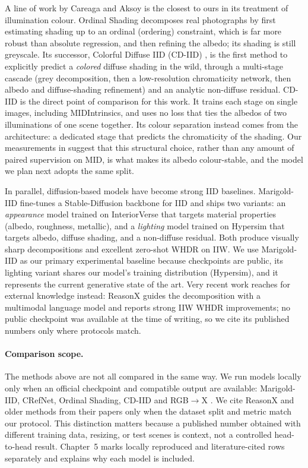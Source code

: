 A line of work by Careaga and Aksoy is the closest to ours in its treatment of
illumination colour.
Ordinal Shading  decomposes real photographs by first
estimating shading up to an ordinal (ordering) constraint, which is far more
robust than absolute regression, and then refining the albedo; its shading is
still greyscale.
Its successor, Colorful Diffuse IID (CD-IID) , is the
first method to explicitly predict a \emph{colored} diffuse shading in the wild,
through a multi-stage cascade (grey decomposition, then a low-resolution
chromaticity network, then albedo and diffuse-shading refinement) and an analytic
non-diffuse residual.
CD-IID is the direct point of comparison for this work. It trains each stage on single
images, including MIDIntrinsics, and uses no loss that ties the albedos of two
illuminations of one scene together. Its colour separation instead comes from the
architecture: a dedicated stage that predicts the chromaticity of the shading. Our
measurements in  suggest that this structural choice, rather than
any amount of paired supervision on MID, is what makes its albedo colour-stable, and the
model we plan next adopts the same split.

In parallel, diffusion-based models have become strong IID baselines.
Marigold-IID  fine-tunes a Stable-Diffusion backbone for
IID and ships two variants: an \emph{appearance} model trained on InteriorVerse
that targets material properties (albedo, roughness, metallic), and a
\emph{lighting} model trained on Hypersim  that targets
albedo, diffuse shading, and a non-diffuse residual.
Both produce visually sharp decompositions and excellent zero-shot WHDR on IIW.
We use Marigold-IID as our primary experimental baseline because checkpoints are
public, its lighting variant shares our model's training distribution (Hypersim), and
it represents the current generative state of the art.
Very recent work reaches for external knowledge instead: ReasonX
 guides the decomposition with a multimodal language model and
reports strong IIW WHDR improvements; no public checkpoint was available at the
time of writing, so we cite its published numbers only where protocols match.

\paragraph{Comparison scope.}
The methods above are not all compared in the same way. We run models locally
only when an official checkpoint and compatible output are available: Marigold-IID,
CRefNet, Ordinal Shading, CD-IID and RGB$\rightarrow$X . We cite
ReasonX and older methods from their papers only when the dataset split and metric
match our protocol. This
distinction matters because a published number obtained with different training
data, resizing, or test scenes is context, not a controlled head-to-head result.
Chapter~5 marks locally reproduced and literature-cited rows separately and
explains why each model is included.

